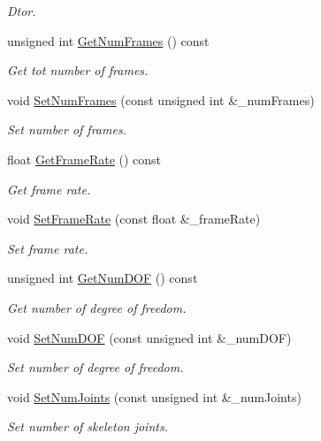 \begin{DoxyCompactItemize}
\begin{DoxyCompactList}\small\item\em Dtor. \end{DoxyCompactList}\item 
unsigned int \hyperlink{class_motion_a449a6a7a1b6cb18650f84817dfe495fc}{Get\+Num\+Frames} () const
\begin{DoxyCompactList}\small\item\em Get tot number of frames. \end{DoxyCompactList}\item 
void \hyperlink{class_motion_ad63d12ad68fab85b26a2c94497ebf423}{Set\+Num\+Frames} (const unsigned int \&\+\_\+num\+Frames)
\begin{DoxyCompactList}\small\item\em Set number of frames. \end{DoxyCompactList}\item 
float \hyperlink{class_motion_a8d7e9bb1ee369497d899597d5e5bde51}{Get\+Frame\+Rate} () const
\begin{DoxyCompactList}\small\item\em Get frame rate. \end{DoxyCompactList}\item 
void \hyperlink{class_motion_a391332c3e0757ce2a101322b7106ead0}{Set\+Frame\+Rate} (const float \&\+\_\+frame\+Rate)
\begin{DoxyCompactList}\small\item\em Set frame rate. \end{DoxyCompactList}\item 
unsigned int \hyperlink{class_motion_abe290354fd6665b50ece211b5061c97c}{Get\+Num\+D\+OF} () const
\begin{DoxyCompactList}\small\item\em Get number of degree of freedom. \end{DoxyCompactList}\item 
void \hyperlink{class_motion_a17d717df4f45a99317bd7144fbf00d6c}{Set\+Num\+D\+OF} (const unsigned int \&\+\_\+num\+D\+OF)
\begin{DoxyCompactList}\small\item\em Set number of degree of freedom. \end{DoxyCompactList}\item 
void \hyperlink{class_motion_a1be9532d5108f5f4726b25f6d2adebad}{Set\+Num\+Joints} (const unsigned int \&\+\_\+num\+Joints)
\begin{DoxyCompactList}\small\item\em Set number of skeleton joints. \end{DoxyCompactList}\item 

\end{DoxyCompactItemize}
